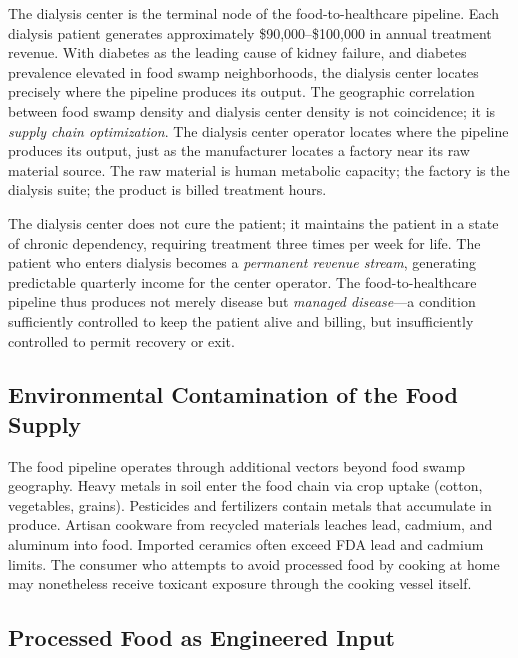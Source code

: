 The dialysis center is the terminal node of the food-to-healthcare pipeline. Each dialysis patient generates approximately \$90,000--\$100,000 in annual treatment revenue. With diabetes as the leading cause of kidney failure, and diabetes prevalence elevated in food swamp neighborhoods, the dialysis center locates precisely where the pipeline produces its output. The geographic correlation between food swamp density and dialysis center density is not coincidence; it is \textit{supply chain optimization}. The dialysis center operator locates where the pipeline produces its output, just as the manufacturer locates a factory near its raw material source. The raw material is human metabolic capacity; the factory is the dialysis suite; the product is billed treatment hours.

The dialysis center does not cure the patient; it maintains the patient in a state of chronic dependency, requiring treatment three times per week for life. The patient who enters dialysis becomes a \textit{permanent revenue stream}, generating predictable quarterly income for the center operator. The food-to-healthcare pipeline thus produces not merely disease but \textit{managed disease}---a condition sufficiently controlled to keep the patient alive and billing, but insufficiently controlled to permit recovery or exit.

\subsection{Environmental Contamination of the Food Supply}

The food pipeline operates through additional vectors beyond food swamp geography. Heavy metals in soil enter the food chain via crop uptake (cotton, vegetables, grains). Pesticides and fertilizers contain metals that accumulate in produce. Artisan cookware from recycled materials leaches lead, cadmium, and aluminum into food. Imported ceramics often exceed FDA lead and cadmium limits. The consumer who attempts to avoid processed food by cooking at home may nonetheless receive toxicant exposure through the cooking vessel itself.

\subsection{Processed Food as Engineered Input}

